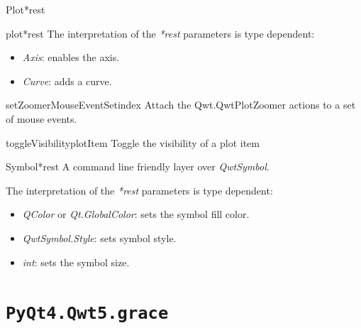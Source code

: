 \documentclass[a4paper,10pt,english]{manual}
\begin{document}
\begin{classdesc}{Plot}{*rest}
\begin{methoddesc}{plot}{*rest}
The interpretation of the \emph{*rest} parameters is type dependent:
\begin{itemize}
\item {} 
\emph{Axis}: enables the axis.

\item {} 
\emph{Curve}: adds a curve.

\end{itemize}
\end{methoddesc}

\hypertarget{PyQt4.Qwt5.qplt.Plot.setZoomerMouseEventSet}{}\begin{methoddesc}{setZoomerMouseEventSet}{index}
Attach the Qwt.QwtPlotZoomer actions to a set of mouse events.
\end{methoddesc}

\hypertarget{PyQt4.Qwt5.qplt.Plot.toggleVisibility}{}\begin{methoddesc}{toggleVisibility}{plotItem}
Toggle the visibility of a plot item
\end{methoddesc}
\end{classdesc}

\hypertarget{PyQt4.Qwt5.qplt.Symbol}{}\begin{classdesc}{Symbol}{*rest}
A command line friendly layer over \emph{QwtSymbol}.

The interpretation of the \emph{*rest} parameters is type dependent:
\begin{itemize}
\item {} 
\emph{QColor} or \emph{Qt.GlobalColor}: sets the symbol fill color.

\item {} 
\emph{QwtSymbol.Style}: sets symbol style.

\item {} 
\emph{int}: sets the symbol size.

\end{itemize}
\end{classdesc}


\section{\texttt{PyQt4.Qwt5.grace}}
\hypertarget{module-PyQt4.Qwt5.grace}{}
\modulesynopsis{}
\end{document}
